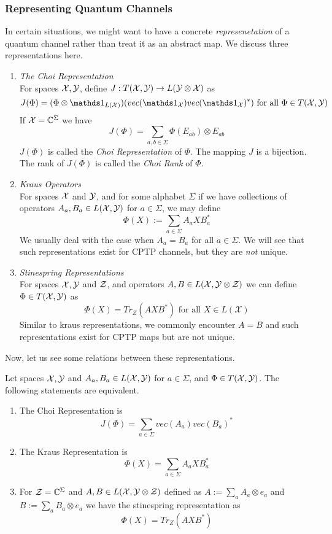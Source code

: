 \subsubsection{Representing Quantum Channels}
In certain situations, we might want to have a concrete \textit{represenetation} of a quantum channel rather than treat it as an abstract map. We discuss three representations here.
\begin{enumerate}
    \item \textit{The Choi Representation}
    \\\noindent  For spaces $\mathcal{X},\mathcal{Y}$, define $J:T(\mathcal{X},\mathcal{Y})\to L(\mathcal{Y}\otimes\mathcal{X})$ as
    \[J(\Phi) = (\Phi\otimes\iden_{L(\X)})(vec(\iden_{\X})vec(\iden_{\X})^*) \text{ for all } \Phi \in T(\X,\Y)\]
    If $\mathcal{X} = \mathbb{C}^{\Sigma}$ we have
    \[J(\Phi) = \sum_{a,b\in\Sigma}\Phi(E_{ab})\otimes E_{ab}\]
    $J(\Phi)$ is called the \textit{Choi Representation} of $\Phi$. The mapping $J$ is a bijection. The rank of $J(\Phi)$ is called the \textit{Choi Rank} of $\Phi$.
    \item \textit{Kraus Operators}\\\noindent 
    For spaces $\mathcal{X}$ and $\mathcal{Y}$, and for some alphabet $\Sigma$ if we have collections of operators $A_a,B_a\in L(\mathcal{X},\mathcal{Y})$ for $a\in\Sigma$, we may define 
    \[\Phi(X) := \sum_{a\in\Sigma}A_aXB_a^*\]
    We usually deal with the case when $A_a = B_a$ for all $a \in \Sigma$. We will see that such representations exist for CPTP channels, but they are \textit{not} unique.
    \item \textit{Stinespring Representations}
    \\ \noindent 
    For spaces $\mathcal{X},\mathcal{Y}$ and $\mathcal{Z}$, and operators $A,B\in L(\mathcal{X},\mathcal{Y}\otimes\mathcal{Z})$ we can define $\Phi\in T(\mathcal{X},\mathcal{Y})$ as 
    \[\Phi(X) = Tr_{Z}(AXB^*) \text{ for all } X\in L(\mathcal{X})\]
    Similar to kraus representations, we commonly encounter $A=B$ and such representations exist for CPTP maps but are not unique.
    
\end{enumerate}
Now, let us see some relations between these representations.
\begin{lemma}[Relations]
Let spaces $\mathcal{X},\mathcal{Y}$ and $A_a,B_a\in L(\mathcal{X},\mathcal{Y})$ for $a\in\Sigma$, and $\Phi\in T(\mathcal{X},\mathcal{Y})$. The following statements are equivalent.
\begin{enumerate}
    \item The Choi Representation is
    $$J(\Phi) = \sum_{a\in\Sigma}vec(A_a)vec(B_a)^*$$
    \item The Kraus Representation is
\[\Phi(X) = \sum_{a\in\Sigma}A_aXB_a^*\]
\item For $\mathcal{Z} = \mathbb{C}^{\Sigma}$ and $A,B\in L(\mathcal{X},\mathcal{Y}\otimes\mathcal{Z})$ defined as
$A := \sum_aA_a\otimes e_a$ and $B := \sum_a B_a\otimes e_a$ we have the stinespring representation as
\[\Phi(X) = Tr_Z(AXB^*)\]
\end{enumerate}

\end{lemma}
